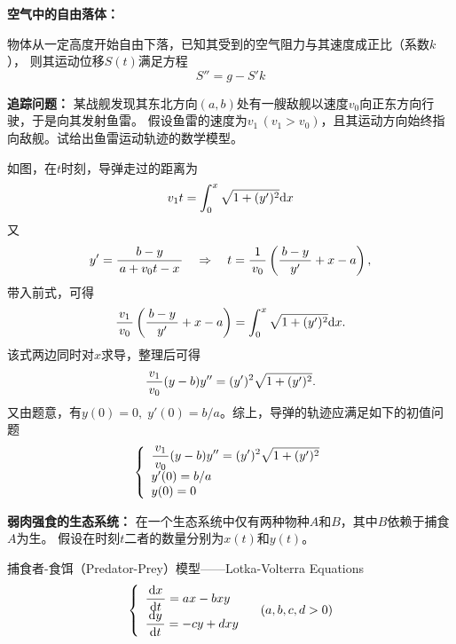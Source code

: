 {\bf 空气中的自由落体：}

物体从一定高度开始自由下落，已知其受到的空气阻力与其速度成正比（系数$k$），
则其运动位移$S(t)$满足方程
$$S''=g-S'k$$

{\bf 追踪问题：}
某战舰发现其东北方向$(a,b)$处有一艘敌舰以速度$v_0$向正东方向行驶，于是向其发射鱼雷。
假设鱼雷的速度为$v_1\,(v_1>v_0)$，且其运动方向始终指向敌舰。试给出鱼雷运动轨迹的数学模型。

\begin{center}
\end{center}

如图，在$t$时刻，导弹走过的距离为
$$v_1t=\displaystyle\int_0^x\sqrt{1+(y')^2}\mathrm{d} x$$
又
$$y'=\displaystyle\frac{\,{b-y}\,}{\,{a+v_0t-x}\,}\quad\Rightarrow\quad
t=\displaystyle\frac{\,{1}\,}{\,{v_0}\,}\left(\displaystyle\frac{\,{b-y}\,}{\,{y'}\,}+x-a\right),$$
带入前式，可得
$$\displaystyle\frac{\,{v_1}\,}{\,{v_0}\,}\left(\displaystyle\frac{\,{b-y}\,}{\,{y'}\,}+x-a\right)=\displaystyle\int_0^x\sqrt{1+(y')^2}\mathrm{d}
x.$$
该式两边同时对$x$求导，整理后可得
$$\displaystyle\frac{\,{v_1}\,}{\,{v_0}\,}(y-b)y''=(y')^2\sqrt{1+(y')^2}.$$
又由题意，有$y(0)=0,\;y'(0)=b/a$。综上，导弹的轨迹应满足如下的{\kaishu 初值问题}
$$
\left\{\begin{array}{l}
\displaystyle\frac{\,{v_1}\,}{\,{v_0}\,}(y-b)y''=(y')^2\sqrt{1+(y')^2}\\
y'(0)=b/a\\
y(0)=0
\end{array}
\right.
$$

{\bf 弱肉强食的生态系统：}
在一个生态系统中仅有两种物种$A$和$B$，其中$B$依赖于捕食$A$为生。
假设在时刻$t$二者的数量分别为$x(t)$和$y(t)$。

{\kaishu 捕食者-食饵（Predator-Prey）模型}——Lotka-Volterra Equations
$$
	\left\{\begin{array}{l}
		\displaystyle\frac{\,{\mathrm{d} x}\,}{\,{\mathrm{d} t}\,}=ax-bxy\\
		\displaystyle\frac{\,{\mathrm{d} y}\,}{\,{\mathrm{d} t}\,}=-cy+dxy
	\end{array}\right.
	\quad (a,b,c,d>0)
$$

